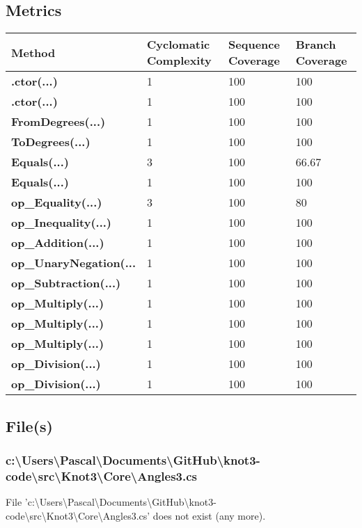 \documentclass[a4paper,10pt]{article}
\begin{document}
\subsection{Metrics}
\begin{longtable}[l]{|l|l|l|l|}
\hline
\textbf{Method} & \textbf{Cyclomatic Complexity} & \textbf{Sequence Coverage} & \textbf{Branch Coverage}\\
\hline
\textbf{.ctor(...)} & 1 & 100 & 100\\
\hline
\textbf{.ctor(...)} & 1 & 100 & 100\\
\hline
\textbf{FromDegrees(...)} & 1 & 100 & 100\\
\hline
\textbf{ToDegrees(...)} & 1 & 100 & 100\\
\hline
\textbf{Equals(...)} & 3 & 100 & 66.67\\
\hline
\textbf{Equals(...)} & 1 & 100 & 100\\
\hline
\textbf{op\_Equality(...)} & 3 & 100 & 80\\
\hline
\textbf{op\_Inequality(...)} & 1 & 100 & 100\\
\hline
\textbf{op\_Addition(...)} & 1 & 100 & 100\\
\hline
\textbf{op\_UnaryNegation(...} & 1 & 100 & 100\\
\hline
\textbf{op\_Subtraction(...)} & 1 & 100 & 100\\
\hline
\textbf{op\_Multiply(...)} & 1 & 100 & 100\\
\hline
\textbf{op\_Multiply(...)} & 1 & 100 & 100\\
\hline
\textbf{op\_Multiply(...)} & 1 & 100 & 100\\
\hline
\textbf{op\_Division(...)} & 1 & 100 & 100\\
\hline
\textbf{op\_Division(...)} & 1 & 100 & 100\\
\hline
\end{longtable}
\subsection{File(s)}
\subsubsection{c:\textbackslash Users\textbackslash Pascal\textbackslash Documents\textbackslash GitHub\textbackslash knot3-code\textbackslash src\textbackslash Knot3\textbackslash Core\textbackslash Angles3.cs}
 File 'c:\textbackslash Users\textbackslash Pascal\textbackslash Documents\textbackslash GitHub\textbackslash knot3-code\textbackslash src\textbackslash Knot3\textbackslash Core\textbackslash Angles3.cs' does not exist (any more).
\newpage
\end{document}
